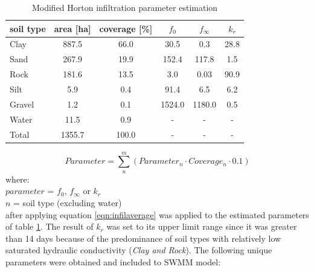 \begin{table}[h]
\caption{Modified Horton infiltration parameter estimation}
\label{tbl:infparamest}
\centering
\begin{tabular}{@{}lccccc@{}}
\toprule
\textbf{soil type} & \textbf{area [ha]} & \textbf{coverage [\%]} & \textbf{$f_0$} & \textbf{$f_\infty$} & \textbf{$k_r$} \\
\midrule
Clay               & 887.5                 & 66.0                       & 30.5          & 0.3                            & 28.8          \\
Sand               & 267.9                 & 19.9                       & 152.4         & 117.8                          & 1.5           \\
Rock               & 181.6                 & 13.5                       & 3.0           & 0.03                            & 90.9          \\
Silt               & 5.9                   & 0.4                        & 91.4          & 6.5                            & 6.2           \\
Gravel             & 1.2                   & 0.1                        & 1524.0        & 1180.0                         & 0.5           \\
Water              & 11.5                  & 0.9                        & -             & -                              & -             \\ \midrule
Total              & 1355.7                & 100.0                      & -             & -                              & - \\           
\bottomrule
\end{tabular}
\end{table}

\begin{equation}
\label{eqn:infilaverage}
Parameter = \sum_{n}^{m}(Parameter_n \cdot Coverage_n \cdot 0.1)
\end{equation}
where: \\
\indent $parameter$ = $f_0$, $f_\infty$ or $k_r$ \\
\indent $n$ = soil type (excluding water) \\

after applying equation \ref{eqn:infilaverage} was applied to the estimated parameters of table \ref{tbl:infparamest}. The result of $k_r$ was set to its upper limit range since it was greater than 14 days because of the predominance of soil types with relatively low saturated hydraulic conductivity (\textit{Clay and Rock}). The following unique parameters were obtained and included to SWMM model:


